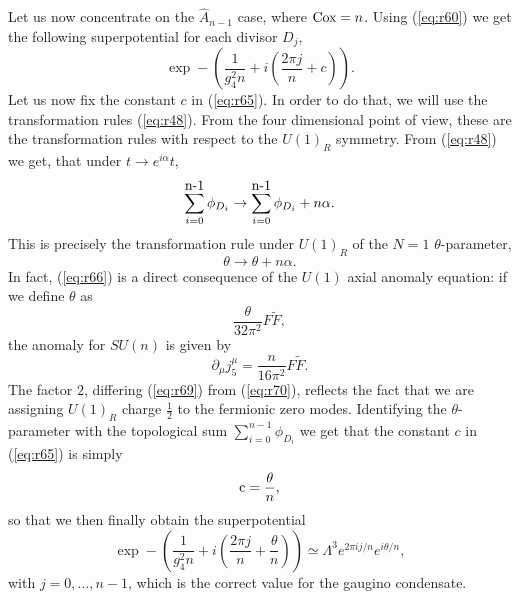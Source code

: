 Let us now concentrate on the $\hat{A}_{n-1}$ case, where $\hbox
{Cox}=n$. Using  (\ref{eq:r60}) we get the following
superpotential for each divisor $D_j$,
\begin{equation}
\exp - \left( \frac {1}{g_4^2 {n}} + i \left( \frac {2
\pi j}{ {n}}+ { c } \right) \right).
\label{eq:r65}
\end{equation}
Let us now fix the constant $c$  in (\ref{eq:r65}). In order to do
that, we will use the transformation rules (\ref{eq:r48}). From
the four dimensional point of view, these are the transformation
rules with respect to the $U(1)_R$ symmetry. From (\ref{eq:r48})
we get, that under $t \rightarrow e^{i \alpha}t$,
\begin{equation}
\sum_{i=0} ^{\hbox {n-1}} \phi_{D_i} \rightarrow
\sum_{i=0}^{\hbox {n-1}} \phi_{D_i} + n \alpha.
\label{eq:r66}
\end{equation}
This is precisely the transformation rule under $U(1)_R$ of the
$N=1$ $\theta$-parameter,
\begin{equation}
\theta \rightarrow \theta +n \alpha.
\label{eq:r67}
\end{equation}
In fact, (\ref{eq:r66}) is a direct consequence of the $U(1)$
axial anomaly equation: if we define $\theta$ as
\begin{equation}
\frac {\theta}{32 \pi^2} F \tilde{F},
\label{eq:r69}
\end{equation}
the anomaly for $SU(n)$ is given by
\begin{equation}
\partial_{\mu} j^{\mu}_5 = \frac {n}{16 \pi^2} F
\tilde{F}.
\label{eq:r70}
\end{equation}
The factor $2$, differing (\ref{eq:r69}) from (\ref{eq:r70}),
reflects the fact that we are assigning $U(1)_R$ charge $\frac
{1}{2}$ to the fermionic zero modes. Identifying the $\theta$-parameter 
with the topological sum $\sum_{i=0}^{n-1} \phi_{D_i}$ we get 
that the constant $c$ in (\ref{eq:r65}) is simply
\begin{equation}
\hbox {c} = \frac {\theta}{n},
\label{eq:r71}
\end{equation}
so that we then finally obtain the superpotential
\begin{equation}
\exp - \left( \frac {1}{g_4^2 n} + i \left( \frac {2
\pi j}{n} + \frac {\theta}{n} \right) \right)
\simeq \Lambda^3 e^{2 \pi ij/n} e^{i \theta/n}, 
\label{eq:r72}
\end{equation}
with $j=0, \ldots , n-1$, which is the correct value
for the gaugino condensate.
  
